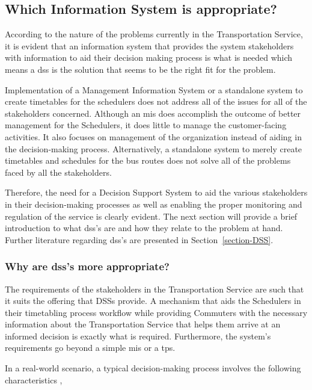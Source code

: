 \subsection{Which Information System is appropriate?}

According to the nature of the problems currently in the Transportation Service, it is evident that an information system that provides the system stakeholders with information to aid their decision making process is what is needed which means a \acrshort{dss} is the solution that seems to be the right fit for the problem.

Implementation of a Management Information System or a standalone system to create timetables for the schedulers does not address all of the issues for all of the stakeholders concerned. Although an \acrshort{mis} does accomplish the outcome of better management for the Schedulers, it does little to manage the customer-facing activities. It also focuses on management of the organization instead of aiding in the decision-making process. Alternatively, a standalone system to merely create timetables and schedules for the bus routes does not solve all of the problems faced by all the stakeholders. 

Therefore, the need for a Decision Support System to aid the various stakeholders in their decision-making processes as well as enabling the proper monitoring and regulation of the service is clearly evident. The next section will provide a brief introduction to what \acrshort{dss}'s are and how they relate to the problem at hand.  Further literature regarding \acrshort{dss}'s are presented in Section~\ref{section-DSS}.

\subsubsection {Why are \acrshort{dss}'s more appropriate?}

The requirements of the stakeholders in the Transportation Service are such that it suits the offering that DSSs provide. A mechanism that aids the Schedulers in their timetabling process workflow while providing Commuters with the necessary information about the Transportation Service that helps them arrive at an informed decision is exactly what is required. Furthermore, the system's requirements go beyond a simple \acrshort{mis} or a \acrshort{tps}.

In a real-world scenario, a typical decision-making process involves the following characteristics \cite{Fedra2000},

